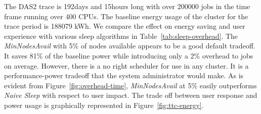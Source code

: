 
The DAS2 trace is 192days and 15hours long with over 200000 jobs in the time frame running over 400 CPUs. The baseline energy usage of the cluster for the trace period is 188079 kWh. We compare the effect on energy saving and user experience with various sleep algorithms in Table~\ref{tab:sleep-overhead}. The \emph{MinNodesAvail} with 5\% of nodes available appears to be a good default tradeoff. It saves 81\% of the baseline power while introducing only a 2\% overhead to jobs on average. However, there is a no right scheduler for use in any cluster. It is a performance-power tradeoff that the system administrator would make. As is evident from Figure~\ref{fig:overhead-time}, \emph{MinNodesAvail} at 5\% easily outperforms \emph{Naive Sleep} with respect to user impact.
The trade off between user response and power usage is graphically represented in Figure~\ref{fig:ttc-energy}.

